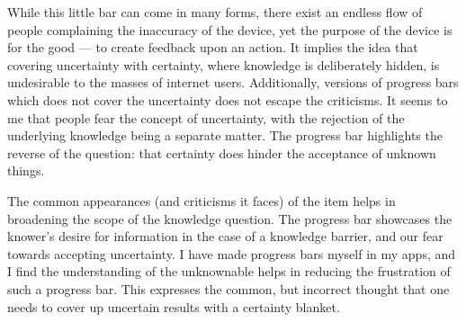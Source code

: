 \documentclass[a4paper,12pt]{article}
\begin{document}
While this little bar can come in many forms, there exist an endless flow of people complaining the inaccuracy of the device, yet the purpose of the device is for the good --- to create feedback upon an action. It implies the idea that covering uncertainty with certainty, where knowledge is deliberately hidden, is undesirable to the masses of internet users. Additionally, versions of progress bars which does not cover the uncertainty does not escape the criticisms. It seems to me that people fear the concept of uncertainty, with the rejection of the underlying knowledge being a separate matter. The progress bar highlights the reverse of the question: that certainty does hinder the acceptance of unknown things.

The common appearances (and criticisms it faces) of the item helps in broadening the scope of the knowledge question. The progress bar showcases the knower's desire for information in the case of a knowledge barrier, and our fear towards accepting uncertainty. I have made progress bars myself in my apps, and I find the understanding of the unknownable helps in reducing the frustration of such a progress bar. This expresses the common, but incorrect thought that one needs to cover up uncertain results with a certainty blanket.


\newpage
\nocite{*}
\printbibliography
\end{document}
